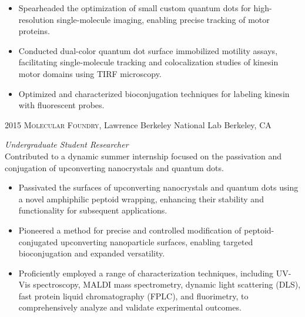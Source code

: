 \begin{entrylist}
{\begin{itemize}
\item Spearheaded the optimization of small custom quantum dots for high-resolution single-molecule imaging, enabling precise tracking of motor proteins.
\item Conducted dual-color quantum dot surface immobilized motility assays, facilitating single-molecule tracking and colocalization studies of kinesin motor domains using TIRF microscopy.
\item Optimized and characterized bioconjugation techniques for labeling kinesin with fluorescent probes.
\end{itemize}}
\entry
{2015}
{\textsc{Molecular Foundry}, Lawrence Berkeley National Lab}
{Berkeley, CA}
{\emph{Undergraduate Student Researcher}\\
Contributed to a dynamic summer internship focused on the passivation and conjugation of upconverting nanocrystals and quantum dots.
\begin{itemize}
\item Passivated the surfaces of upconverting nanocrystals and quantum dots using a novel amphiphilic peptoid wrapping, enhancing their stability and functionality for subsequent applications.
\item Pioneered a method for precise and controlled modification of peptoid-conjugated upconverting nanoparticle surfaces, enabling targeted bioconjugation and expanded versatility.
\item Proficiently employed a range of characterization techniques, including UV-Vis spectroscopy, MALDI mass spectrometry, dynamic light scattering (DLS), fast protein liquid chromatography (FPLC), and fluorimetry, to comprehensively analyze and validate experimental outcomes.
\end{itemize}}
\end{entrylist}

